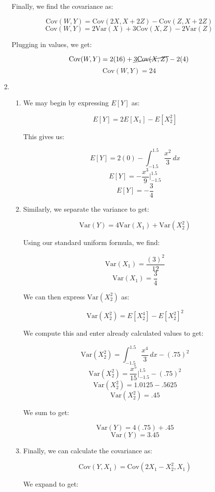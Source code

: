 \begin{enumerate}
    Finally, we find the covariance as:

    $$\text{Cov}(W,Y)=\text{Cov}(2X,X+2Z)-\text{Cov}(Z, X+2Z)$$
    $$\text{Cov}(W,Y)=2\text{Var}(X) + 3\text{Cov}(X,Z)-2\text{Var}(Z)$$

    Plugging in values, we get:

    $$\text{Cov}(W,Y)=2(16) + \cancel{3\text{Cov}(X,Z)}-2(4)$$
    $$\boxed{\text{Cov}(W,Y)=24}$$

  \item

    \begin{enumerate}

      \item We may begin by expressing $E[Y]$ as:

        $$E[Y]=2E[X_1]-E[X_2^2]$$

        This gives us:

        $$E[Y]=2(0)-\int_{-1.5}^{1.5} \frac{x^2}{3}\,dx$$
        $$E[Y]=-\frac{x^3}{9}\Big|_{-1.5}^{1.5}$$
        $$\boxed{E[Y]=-\frac{3}{4}}$$

      \item Similarly, we separate the variance to get:

        $$\text{Var}(Y)=4\text{Var}(X_1)+\text{Var}(X_2^2)$$

        Using our standard uniform formula, we find:

        $$\text{Var}(X_1)=\frac{(3)^2}{12}$$
        $$\text{Var}(X_1)=\frac{3}{4}$$

        We can then express $\text{Var}(X_2^2)$ as:

        $$\text{Var}(X^2_2)=E[X_2^4]-E[X_2^2]^2$$

        We compute this and enter already calculated values to get:

        $$\text{Var}(X^2_2)=\int_{-1.5}^{1.5}\frac{x^4}{3}\,dx-(.75)^2$$
        $$\text{Var}(X^2_2)=\frac{x^5}{15}\Big|_{-1.5}^{1.5}-(.75)^2$$
        $$\text{Var}(X^2_2)=1.0125-.5625$$
        $$\text{Var}(X^2_2)=.45$$

        We sum to get:

        $$\text{Var}(Y)=4(.75)+.45$$
        $$\boxed{\text{Var}(Y)=3.45}$$

      \item Finally, we can calculate the covariance as:

        $$\text{Cov}(Y,X_1)=\text{Cov}(2X_1-X_2^2,X_1)$$

        We expand to get:


\end{enumerate}
\end{enumerate}
